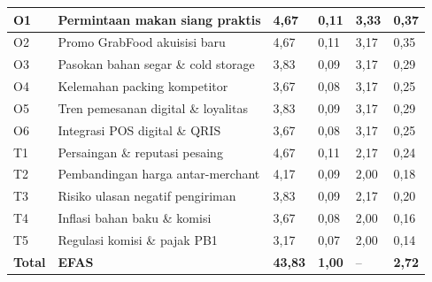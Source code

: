 \begin{xltabular}{\textwidth}{|C{0.8cm}|Y|C{2.0cm}|C{2.0cm}|C{1.8cm}|C{2.2cm}|}
O1 & Permintaan makan siang praktis & 4,67 & 0,11 & 3,33 & 0,37 \\ \hline
O2 & Promo GrabFood akuisisi baru & 4,67 & 0,11 & 3,17 & 0,35 \\ \hline
O3 & Pasokan bahan segar \& cold storage & 3,83 & 0,09 & 3,17 & 0,29 \\ \hline
O4 & Kelemahan packing kompetitor & 3,67 & 0,08 & 3,17 & 0,25 \\ \hline
O5 & Tren pemesanan digital \& loyalitas & 3,83 & 0,09 & 3,17 & 0,29 \\ \hline
O6 & Integrasi POS digital \& QRIS & 3,67 & 0,08 & 3,17 & 0,25 \\ \hline
T1 & Persaingan \& reputasi pesaing & 4,67 & 0,11 & 2,17 & 0,24 \\ \hline
T2 & Pembandingan harga antar-merchant & 4,17 & 0,09 & 2,00 & 0,18 \\ \hline
T3 & Risiko ulasan negatif pengiriman & 3,83 & 0,09 & 2,17 & 0,20 \\ \hline
T4 & Inflasi bahan baku \& komisi & 3,67 & 0,08 & 2,00 & 0,16 \\ \hline
T5 & Regulasi komisi \& pajak PB1 & 3,17 & 0,07 & 2,00 & 0,14 \\ \hline
\textbf{Total} & \textbf{EFAS} & \textbf{43,83} & \textbf{1,00} & -- & \textbf{2,72} \\ \hline
\end{xltabular}
\endgroup
